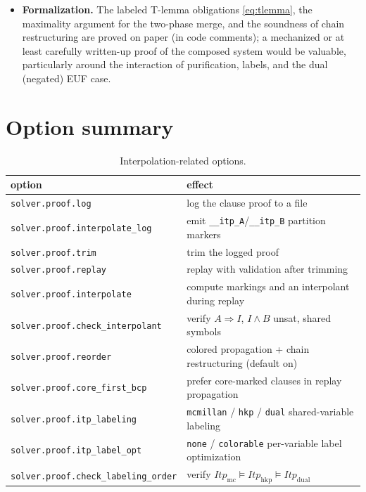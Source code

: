 \documentclass[11pt]{article}
\newcommand{\Itp}{\mathit{Itp}}
\newcommand{\opt}[1]{\texttt{#1}}
\newcommand{\code}[1]{\texttt{#1}}
\begin{document}
\begin{itemize}
      colored propagation and chain restructuring where they matter
      (large, deletion-heavy proofs) and quantify the effect of
      \opt{core\_first\_bcp} and \opt{colorable} on interpolant size and
      convergence.
\item \textbf{Formalization.} The labeled T-lemma obligations
      \eqref{eq:tlemma}, the maximality argument for the two-phase merge,
      and the soundness of chain restructuring are proved on paper (in
      code comments); a mechanized or at least carefully written-up proof
      of the composed system would be valuable, particularly around the
      interaction of purification, labels, and the dual (negated) EUF
      case.
\end{itemize}

\appendix

\section{Option summary}

\begin{table}[h]
\centering
\small
\begin{tabular}{lp{8.2cm}}
\toprule
option & effect \\
\midrule
\opt{solver.proof.log} & log the clause proof to a file \\
\opt{solver.proof.interpolate\_log} & emit \code{\_\_itp\_A}/\code{\_\_itp\_B} partition markers \\
\opt{solver.proof.trim} & trim the logged proof \\
\opt{solver.proof.replay} & replay with validation after trimming \\
\opt{solver.proof.interpolate} & compute markings and an interpolant during replay \\
\opt{solver.proof.check\_interpolant} & verify $A \Rightarrow I$, $I \wedge B$ unsat, shared symbols \\
\opt{solver.proof.reorder} & colored propagation + chain restructuring (default on) \\
\opt{solver.proof.core\_first\_bcp} & prefer core-marked clauses in replay propagation \\
\opt{solver.proof.itp\_labeling} & \opt{mcmillan} / \opt{hkp} / \opt{dual} shared-variable labeling \\
\opt{solver.proof.itp\_label\_opt} & \opt{none} / \opt{colorable} per-variable label optimization \\
\opt{solver.proof.check\_labeling\_order} & verify $\Itp_{\text{mc}} \models \Itp_{\text{hkp}} \models \Itp_{\text{dual}}$ \\
\bottomrule
\end{tabular}
\caption{Interpolation-related options.}
\label{tab:options}
\end{table}
\end{document}
